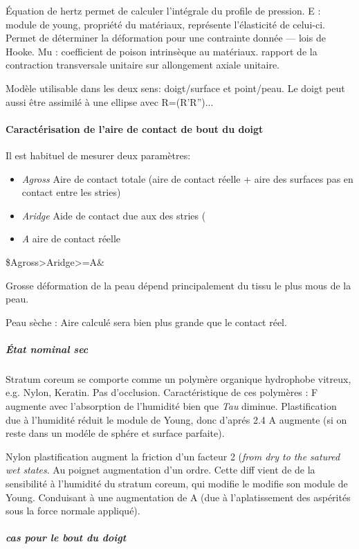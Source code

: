 Équation de hertz permet de calculer l'intégrale du profile de pression. E : module de young, propriété du matériaux, représente l'élasticité de celui-ci. Permet de déterminer la déformation pour une contrainte donnée --- lois de Hooke. Mu : coefficient de poison intrinsèque au matériaux. rapport de la contraction transversale unitaire sur allongement axiale unitaire.

Modèle utilisable dans les deux sens: doigt/surface et point/peau. Le doigt peut aussi être assimilé à une ellipse avec R=(R'R'')...

\paragraph{Caractérisation de l'aire de contact de bout du doigt}

Il est habituel de mesurer deux paramètres: 
\begin{itemize}
	\item \textit{Agross} Aire de contact totale (aire de contact réelle + aire des surfaces pas en contact entre les stries)
	\item \textit{Aridge} Aide de contact due aux des stries
	(\item \textit {A} aire de contact réelle
\end{itemize}
 \$Agross>Aridge>=A\&
 
 Grosse déformation de la peau dépend principalement du tissu le plus mous de la peau.
 
 Peau sèche : Aire calculé sera bien plus grande que le contact réel.
 
\subparagraph{État nominal sec}
 
 Stratum coreum se comporte comme un polymère organique hydrophobe vitreux, e.g. Nylon, Keratin. Pas d'occlusion. 
 Caractéristique de ces polymères : F augmente avec l'absorption de l'humidité bien que \textit{Tau} diminue. Plastification due à l'humidité réduit le module de Young, donc d'aprés 2.4 A augmente (si on reste dans un modéle de sphére et surface parfaite).
 
 Nylon plastification augment la friction d'un facteur 2 (\textit{from dry to the satured wet states}. Au poignet augmentation d'un ordre. Cette diff vient de de la sensibilité à l'humidité du stratum coreum, qui modifie le modifie son module de Young. Conduisant à une augmentation de A (due à l'aplatissement des aspérités sous la force normale appliqué).
 
\subparagraph{cas pour le bout du doigt}
 
